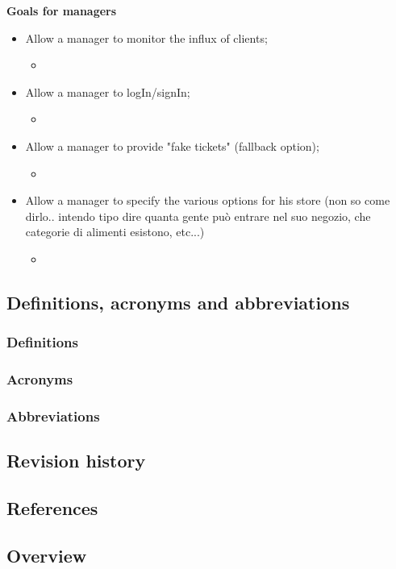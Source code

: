 \textbf{Goals for managers}
\begin{itemize}
    \item Allow a manager to monitor the influx of clients;
        \begin{itemize}
            \item 
        \end{itemize}
    \item Allow a manager to logIn/signIn;
        \begin{itemize}
            \item 
        \end{itemize}
    \item Allow a manager to provide "fake tickets" (fallback option);
        \begin{itemize}
            \item 
        \end{itemize}
    \item Allow a manager to specify the various options for his store (non so come dirlo.. intendo tipo dire quanta gente può entrare nel suo negozio, che categorie di alimenti esistono, etc...)
        \begin{itemize}
            \item 
        \end{itemize}
\end{itemize}
\subsection{Definitions, acronyms and abbreviations}
\subsubsection{Definitions}
\subsubsection{Acronyms}
\subsubsection{Abbreviations}
\subsection{Revision history}
\subsection{References}
\subsection{Overview}